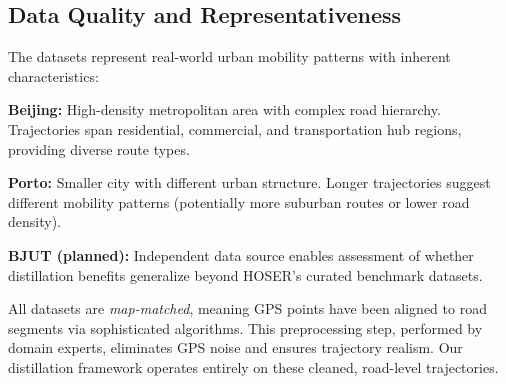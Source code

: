 \subsection{Data Quality and Representativeness}
\label{sec:data-quality}

The datasets represent real-world urban mobility patterns with inherent characteristics:

\textbf{Beijing:} High-density metropolitan area with complex road hierarchy. Trajectories span residential, commercial, and transportation hub regions, providing diverse route types.

\textbf{Porto:} Smaller city with different urban structure. Longer trajectories suggest different mobility patterns (potentially more suburban routes or lower road density).

\textbf{BJUT (planned):} Independent data source enables assessment of whether distillation benefits generalize beyond HOSER's curated benchmark datasets.

All datasets are \emph{map-matched}, meaning GPS points have been aligned to road segments via sophisticated algorithms. This preprocessing step, performed by domain experts, eliminates GPS noise and ensures trajectory realism. Our distillation framework operates entirely on these cleaned, road-level trajectories.

